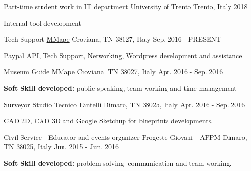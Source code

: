 \begin{cventries}
  \cventry
{Part-time student work in IT department} %
{\href{https://www.unitn.it}{University of Trento}} %
{Trento, Italy} %
{2018} %
{
  \begin{cvitems} %
    \item {Internal tool development}
  \end{cvitems}
  }

\cventry
{Tech Support} %
{\href{https://www.mmape.it}{MMape}} %
{Croviana, TN 38027, Italy} %
{Sep. 2016 - PRESENT} %
{
  \begin{cvitems} %
    \item {Paypal API, Tech Support, Networking, Wordpress development and assistance}
  \end{cvitems}
}

\cventry
{Museum Guide} %
{\href{https://www.mmape.it}{MMape}} %
{Croviana, TN 38027, Italy} %
{Apr. 2016 - Sep. 2016} %
{
  \begin{cvitems} %
    \item {\textbf{Soft Skill developed:} public speaking, team-working and time-management}
  \end{cvitems}
}

\cventry
{Surveyor} %
{Studio Tecnico Fantelli} %
{Dimaro, TN 38025, Italy} %
{Apr. 2016 - Sep. 2016} %
{
  \begin{cvitems} %
    \item {CAD 2D, CAD 3D and Google Sketchup for blueprints developments.}
  \end{cvitems}
}

\cventry
{Civil Service - Educator and events organizer} %
{Progetto Giovani - APPM} %
{Dimaro, TN 38025, Italy} %
{Jun. 2015 - Jun. 2016} %
{
  \begin{cvitems} %
    \item {\textbf{Soft Skill developed:} problem-solving, communication and team-working.}
  \end{cvitems}
}

\end{cventries}
